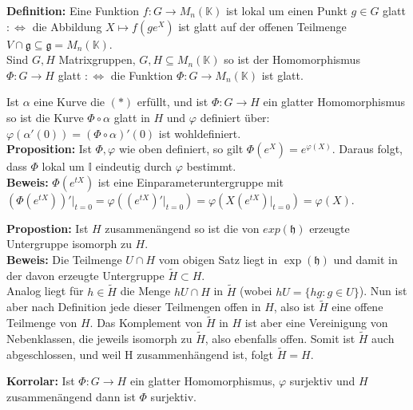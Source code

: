 \documentclass[11pt]{beamer}
\begin{document}
\begin{frame}
		\textbf{Definition:}
		Eine Funktion $f: G\to M_n(\mathbb{K})$ ist lokal um einen Punkt $g \in G$ glatt $:\Leftrightarrow$ die Abbildung $X \mapsto f(ge^X)$ ist glatt auf der offenen Teilmenge $V \cap \mathfrak g \subseteq \mathfrak g = M_n(\mathbb{K})$. \\[1em] \pause
		Sind $G, H$ Matrixgruppen, $G,H \subseteq M_n(\mathbb{K})$ so ist der Homomorphismus $\Phi:G \to H$ glatt $:\Leftrightarrow$ die Funktion $\Phi:G \to M_n(\mathbb{K})$ ist glatt.
\end{frame}

\begin{frame}
	Ist $\alpha$ eine Kurve die $(*)$ erfüllt, und ist $\Phi:G \to H$ ein glatter Homomorphismus so ist die Kurve $\Phi\circ\alpha$ glatt in $H$ und $\varphi$ definiert über:  $\varphi(\alpha'(0)) = (\Phi\circ\alpha)'(0)$ ist wohldefiniert. \\[1em] \pause
	\textbf{Proposition:}
	Ist $\Phi, \varphi$ wie oben definiert, so gilt $\Phi(e^X) = e^{\varphi(X)}$.
	Daraus folgt, dass $\Phi$ lokal um $\mathbb{I}$ eindeutig durch $\varphi$ bestimmt. \\[1em] \pause
	\textbf{Beweis:}
	$\Phi(e^{tX})$ ist eine Einparameteruntergruppe mit $(\Phi(e^{tX}))'\big\vert_{t=0} = \varphi((e^{tX})'\big\vert_{t=0}) = \varphi(X(e^{tX})\big\vert_{t=0}) = \varphi(X)$.
\end{frame}


\begin{frame}
	\textbf{Propostion:}
	Ist $H$ zusammenängend so ist die von $exp(\mathfrak{h})$ erzeugte Untergruppe isomorph zu $H$.\\ [1em] \pause
	\textbf{Beweis:}
	Die Teilmenge $U\cap H$ vom obigen Satz liegt in $\exp(\mathfrak h)$ und damit in der davon erzeugte Untergruppe $\tilde H\subset H$. \\ \pause
	Analog liegt für $h\in\tilde H$ die Menge $hU\cap H$ in $\tilde H$ (wobei $hU = \{hg:g\in U\}$).
	Nun ist aber nach Definition jede dieser Teilmengen offen in $H$,\pause
	 also ist $\tilde H$ eine offene Teilmenge von $H$.
	Das Komplement von $\tilde H$ in $H$ ist aber eine Vereinigung von Nebenklassen, die jeweils
	isomorph zu $\tilde H$, also ebenfalls offen. \pause
	Somit ist $\tilde H$ auch abgeschlossen, und weil H
	zusammenhängend ist, folgt $\tilde H=H$. \\[1em] \pause

	\textbf{Korrolar:}
	Ist $\Phi:G \rightarrow H$ ein glatter Homomorphismus, $\varphi$ surjektiv
	und $H$ zusammenängend dann ist $\Phi$ surjektiv. \\[1em]
\end{frame}
\end{document}
